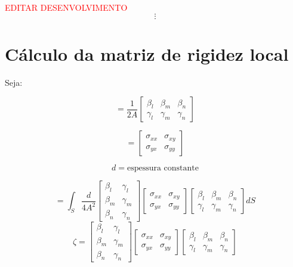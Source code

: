 \documentclass[
12pt,
a4paper,
oneside,
chapter=TITLE,
sumario=tradicional
]{abntex2}
\begin{document}
    
    \textcolor{red}{EDITAR DESENVOLVIMENTO}
        \begin{equation*}
    	\vdots
    \end{equation*}
    
    \section{Cálculo da matriz de rigidez local}
    Seja:
    
    \begin{equation}
    	[B] = \frac{1}{2A} 
    	\begin{bmatrix} \beta_l & \beta_m& \beta_n\\ 
    		\gamma_l& \gamma_m& \gamma_n \end{bmatrix} \label{eq:MEF_eq_0006}
    \end{equation}
    
    \begin{equation}
    	[D] = \begin{bmatrix} \sigma_{xx} & \sigma_{xy}\\ \sigma_{yx}& \sigma_{yy} \end{bmatrix}  \label{eq:MEF_eq_0007}
    \end{equation}
    
    
    
    \begin{equation*}
    	d = \text{espessura constante}
    \end{equation*}
    
    \begin{equation*}
    	[k] = \int_S \frac{d}{4A^2} 
    	\begin{bmatrix}
    		\beta_l & \gamma_l\\
    		\beta_m & \gamma_m\\
    		\beta_n & \gamma_n
    	\end{bmatrix}
    	\begin{bmatrix} \sigma_{xx} & \sigma_{xy}\\ \sigma_{yx}& \sigma_{yy} \end{bmatrix} 
    	\begin{bmatrix} \beta_l & \beta_m& \beta_n\\ 
    		\gamma_l& \gamma_m& \gamma_n \end{bmatrix} dS
    \end{equation*}
    \begin{equation*}
	\zeta = 
	\begin{bmatrix}
		\beta_l & \gamma_l\\
		\beta_m & \gamma_m\\
		\beta_n & \gamma_n
	\end{bmatrix}
	\begin{bmatrix} \sigma_{xx} & \sigma_{xy}\\ \sigma_{yx}& \sigma_{yy} \end{bmatrix} 
	\begin{bmatrix} \beta_l & \beta_m& \beta_n\\ 
		\gamma_l& \gamma_m& \gamma_n \end{bmatrix}
\end{equation*}
\end{document}
